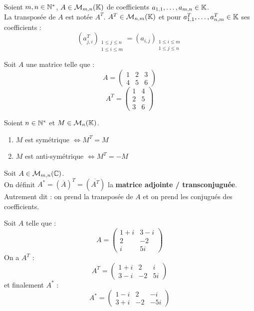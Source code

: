 \begin{definition}[Transposée]
	Soient $m, n \in \mathbb{N}^*$, $A \in \mathcal{M}_{m, n}(\mathbb{K})$ de coefficients $a_{1,1}, \ldots, a_{m,n} \in \mathbb{K}$.
	\\
	La transposée de $A$ est notée $A^T$. $A^T \in \mathcal{M}_{n,m}(\mathbb{K})$ et pour $a^T_{1,1}, \ldots, a^T_{n,m} \in \mathbb{K}$ ses coefficients :
	\[ (a^T_{j,i})_{\substack{1 \leq j \leq n \\ 1 \leq i \leq m}} = (a_{i,j})_{\substack{1 \leq i \leq m \\ 1 \leq j \leq n}} \]
\end{definition}

\begin{example}
	Soit $A$ une matrice telle que :
	\[ 
	A = 
	\begin{pmatrix}
	1 & 2 & 3 \\
	4 & 5 & 6
	\end{pmatrix}
	\]
	\[
	A^T =
	\begin{pmatrix}
	1 & 4 \\
	2 & 5 \\
	3 & 6
	\end{pmatrix}
	\]
\end{example}

\begin{definition}
	Soient $n \in \mathbb{N}^*$ et $M \in \mathcal{M}_n(\mathbb{K})$.
	    \begin{enumerate}
    		\item $M$ est symétrique $\iff M^T = M$
    		\item $M$ est anti-symétrique $\iff M^T = -M$
    	\end{enumerate}
\end{definition}

\begin{definition}
	Soit $A \in \mathcal{M}_{m,n}(\mathbb{C})$.
	\\
	On définit $A^* = (\overline{A})^T = (\overline{A^T})$ la \textbf{matrice adjointe / transconjuguée}.
	Autrement dit : on prend la transposée de $A$ et on prend les conjugués des coefficients.
\end{definition}

\begin{example}
	Soit $A$ telle que :
	\[ A =
	\begin{pmatrix}
		1 + i & 3 - i \\
		2 & -2 \\
		i & 5i
	\end{pmatrix}
	\]
	On a $A^T$ :
	\[ 
	A^T = 
	\begin{pmatrix}
		1 + i  & 2 & i \\
		3 - i & -2 & 5i
	\end{pmatrix}
	\]
	et finalement $A^*$ :
	\[
	A^* =
	\begin{pmatrix}
		1 - i & 2 & -i \\
		3 + i & -2 & -5i
	\end{pmatrix}
	\]
\end{example}

